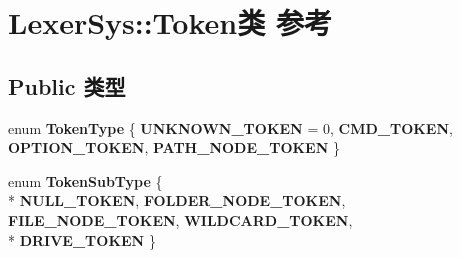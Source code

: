 \hypertarget{class_lexer_sys_1_1_token}{\section{Lexer\-Sys\-:\-:Token类 参考}
\label{class_lexer_sys_1_1_token}
}
\subsection*{Public 类型}
\begin{DoxyCompactItemize}
\item 
enum {\bfseries Token\-Type} \{ {\bfseries U\-N\-K\-N\-O\-W\-N\-\_\-\-T\-O\-K\-E\-N} = 0, 
{\bfseries C\-M\-D\-\_\-\-T\-O\-K\-E\-N}, 
{\bfseries O\-P\-T\-I\-O\-N\-\_\-\-T\-O\-K\-E\-N}, 
{\bfseries P\-A\-T\-H\-\_\-\-N\-O\-D\-E\-\_\-\-T\-O\-K\-E\-N}
 \}
\item 
enum {\bfseries Token\-Sub\-Type} \{ \\*
{\bfseries N\-U\-L\-L\-\_\-\-T\-O\-K\-E\-N}, 
{\bfseries F\-O\-L\-D\-E\-R\-\_\-\-N\-O\-D\-E\-\_\-\-T\-O\-K\-E\-N}, 
{\bfseries F\-I\-L\-E\-\_\-\-N\-O\-D\-E\-\_\-\-T\-O\-K\-E\-N}, 
{\bfseries W\-I\-L\-D\-C\-A\-R\-D\-\_\-\-T\-O\-K\-E\-N}, 
\\*
{\bfseries D\-R\-I\-V\-E\-\_\-\-T\-O\-K\-E\-N}
 \}
\end{DoxyCompactItemize}
